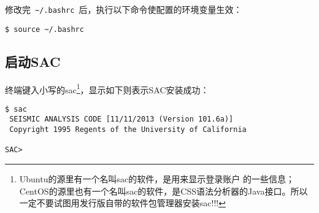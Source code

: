 修改完~\lstinline{~/.bashrc}~后，执行以下命令使配置的环境变量生效：
\begin{lstlisting}[style=Shell]
$ source ~/.bashrc
\end{lstlisting}

\subsection*{启动SAC}
终端键入小写的sac\footnote{Ubuntu的源里有一个名叫sac的软件，是用来显示登录账户
的一些信息；CentOS的源里也有一个名叫sac的软件，是CSS语法分析器的Java接口。所以
一定不要试图用发行版自带的软件包管理器安装sac!!!}，显示如下则表示SAC安装成功：
\begin{lstlisting}[style=Shell]
$ sac
 SEISMIC ANALYSIS CODE [11/11/2013 (Version 101.6a)]
 Copyright 1995 Regents of the University of California

SAC>
\end{lstlisting}
